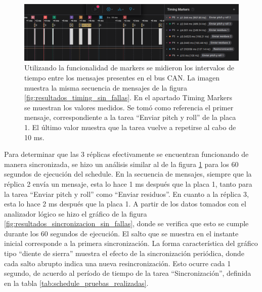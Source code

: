 \begin{figure}[H]
    \centering
    \includegraphics[width=\textwidth]{img/resultados_timing_detalle_sin_fallas.png}
    \caption{Utilizando la funcionalidad de markers se midieron los intervalos de tiempo entre los mensajes presentes en el bus CAN. La imagen muestra la misma secuencia de mensajes de la figura \ref{fig:resultados_timing_sin_fallas}. En el apartado Timing Markers se muestran los valores medidos. Se tomó como referencia el primer mensaje, correspondiente a la tarea ``Enviar pitch y roll'' de la placa 1. El último valor muestra que la tarea vuelve a repetirse al cabo de 10 ms.}
    \label{fig:resultados_timing_detalle_sin_fallas}
\end{figure}

Para determinar que las 3 réplicas efectivamente se encuentran funcionando de manera sincronizada, se hizo un análisis similar al de la figura \ref{fig:resultados_timing_detalle_sin_fallas} para los 60 segundos de ejecución del schedule. En la secuencia de mensajes, siempre que la réplica 2 envía un mensaje, esta lo hace 1 ms después que la placa 1, tanto para la tarea ``Enviar pitch y roll'' como ``Enviar residuos''. En cuanto a la réplica 3, esta lo hace 2 ms después que la placa 1. A partir de los datos tomados con el analizador lógico se hizo el gráfico de la figura \ref{fig:resultados_sincronizacion_sin_fallas}, donde se verifica que esto se cumple durante los 60 segundos de ejecución. El salto que se muestra en el instante inicial corresponde a la primera sincronización. La forma característica del gráfico tipo ``diente de sierra'' muestra el efecto de la sincronización periódica, donde cada salto abrupto indica una nueva resincronización. Esto ocurre cada 1 segundo, de acuerdo al período de tiempo de la tarea ``Sincronización'', definida en la tabla \ref{tab:schedule_pruebas_realizadas}.

